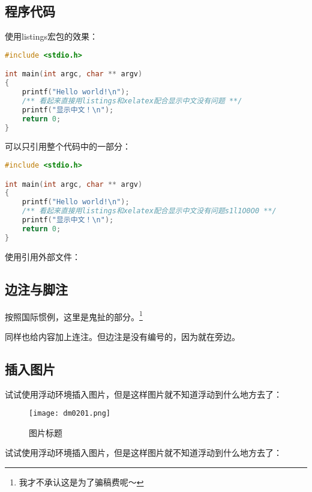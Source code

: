 		\subsection{程序代码}

			使用listings宏包的效果：

\begin{lstlisting}[language=C]
#include <stdio.h>

int main(int argc, char ** argv)
{
	printf("Hello world!\n");
	/** 看起来直接用listings和xelatex配合显示中文没有问题 **/
	printf("显示中文！\n");
	return 0;
}
\end{lstlisting}

			可以只引用整个代码中的一部分：

\begin{lstlisting}[language=C,firstline=3,lastline=9]
#include <stdio.h>

int main(int argc, char ** argv)
{
	printf("Hello world!\n");
	/** 看起来直接用listings和xelatex配合显示中文没有问题s1l1O0O0 **/
	printf("显示中文！\n");
	return 0;
}
\end{lstlisting}

			使用\verb||引用外部文件：

			

		\subsection{边注与脚注}
			按照国际惯例，这里是鬼扯的部分。\footnote{我才不承认这是为了骗稿费呢～}

			同样也给内容加上连注。但边注是没有编号的，因为就在旁边。

		\subsection{插入图片}

			试试使用浮动环境插入图片，但是这样图片就不知道浮动到什么地方去了：

			\begin{figure}[htbp]                        %
				\centering                              %
				\texttt{[image: dm0201.png]} %
				\caption{图片标题}            %
				\label{dm0201}                %
			\end{figure}

			试试使用浮动环境插入图片，但是这样图片就不知道浮动到什么地方去了：

